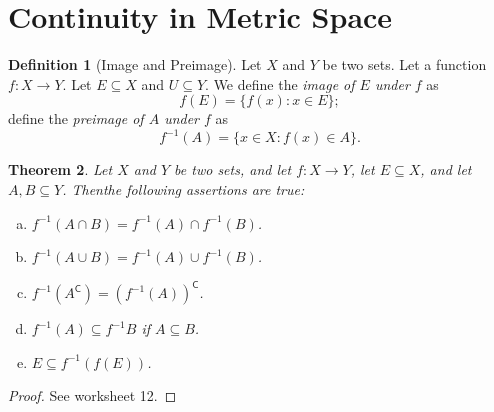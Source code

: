 \documentclass[12pt, lettersize]{book}
\theoremstyle{plain}
\newtheorem{thm}{Theorem}[section]
\theoremstyle{definition}
\newtheorem{dfn}[thm]{Definition}
\theoremstyle{remark}
\newcommand{\com}{\mathsf{C}}
\begin{document}
		\section{Continuity in Metric Space}
			\begin{dfn}[Image and Preimage]
			Let $X$ and $Y$ be two sets. Let a function $f: X\rightarrow Y$. Let $E\subseteq X$ and $U\subseteq Y$. We define the \emph{image of $E$ under $f$} as
			\begin{displaymath}
				f(E)=\{f(x): x\in E\};
			\end{displaymath}
			define the \emph{preimage of $A$ under $f$} as
			\begin{displaymath}
				f^{-1}(A)=\{x\in X: f(x)\in A\}.
			\end{displaymath}
			\end{dfn}
			
			\begin{thm}
			Let $X$ and $Y$ be two sets, and let $f: X\rightarrow Y$, let $E\subseteq X$, and let $A,B\subseteq Y$. Thenthe following assertions are true:
			\begin{enumerate}[(a)]
				\item $f^{-1}(A\cap B)=f^{-1}(A)\cap f^{-1}(B)$.
				\item $f^{-1}(A\cup B)=f^{-1}(A)\cup f^{-1}(B)$.
				\item $f^{-1}(A^\com)=(f^{-1}(A))^\com$.
				\item $f^{-1}(A)\subseteq f^{-1}B$ if $A\subseteq B$.
				\item $E\subseteq f^{-1}(f(E))$.
			\end{enumerate}
			\end{thm}
			\begin{proof}
				See worksheet 12.
			\end{proof}
			
\end{document}
